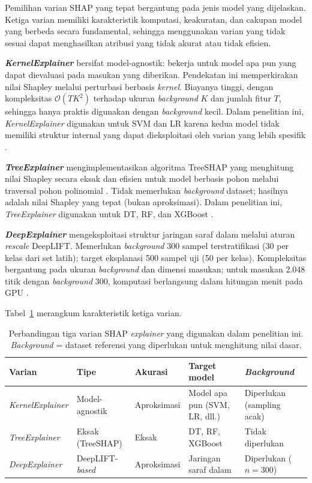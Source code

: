 Pemilihan varian SHAP yang tepat bergantung pada jenis model yang
dijelaskan. Ketiga varian memiliki karakteristik komputasi, keakuratan, dan
cakupan model yang berbeda secara fundamental, sehingga menggunakan varian
yang tidak sesuai dapat menghasilkan atribusi yang tidak akurat atau tidak
efisien.

\textbf{\emph{KernelExplainer}} bersifat model-agnostik: bekerja untuk model
apa pun yang dapat dievaluasi pada masukan yang diberikan. Pendekatan ini
memperkirakan nilai Shapley melalui perturbasi berbasis \emph{kernel}. Biayanya
tinggi, dengan kompleksitas $\mathcal{O}(TK^2)$ terhadap ukuran \emph{background}
$K$ dan jumlah fitur $T$, sehingga hanya praktis digunakan dengan
\emph{background} kecil. Dalam penelitian ini, \emph{KernelExplainer}
digunakan untuk SVM dan LR karena kedua model tidak memiliki struktur internal
yang dapat dieksploitasi oleh varian yang lebih spesifik
.

\textbf{\emph{TreeExplainer}} mengimplementasikan algoritma TreeSHAP yang
menghitung nilai Shapley secara eksak dan efisien untuk model berbasis pohon
melalui traversal pohon polinomial . Tidak
memerlukan \emph{background} dataset; hasilnya adalah nilai Shapley yang
tepat (bukan aproksimasi). Dalam penelitian ini, \emph{TreeExplainer}
digunakan untuk DT, RF, dan XGBoost .

\textbf{\emph{DeepExplainer}} mengeksploitasi struktur jaringan saraf dalam
melalui aturan \emph{rescale} DeepLIFT. Memerlukan \emph{background} 300 sampel
terstratifikasi (30 per kelas dari set latih); target eksplanasi 500 sampel uji
(50 per kelas). Kompleksitas bergantung pada ukuran \emph{background} dan
dimensi masukan; untuk masukan 2.048 titik dengan \emph{background} 300, komputasi
berlangsung dalam hitungan menit pada GPU .

Tabel~\ref{tab:bab2_shap_variants} merangkum karakteristik ketiga varian.

\begin{table}[ht]
  \centering
  \caption{Perbandingan tiga varian SHAP \emph{explainer} yang digunakan dalam
           penelitian ini. \emph{Background} = dataset referensi yang diperlukan
           untuk menghitung nilai dasar.}
  \label{tab:bab2_shap_variants}
  \footnotesize
  \begin{tabularx}{\textwidth}{@{}l l l X l@{}}
    \toprule
    \textbf{Varian} & \textbf{Tipe} & \textbf{Akurasi} & \textbf{Target model}
      & \textbf{\emph{Background}} \\
    \midrule
    \emph{KernelExplainer}
      & Model-agnostik & Aproksimasi & Model apa pun (SVM, LR, dll.)
      & Diperlukan (sampling acak) \\
    \emph{TreeExplainer}
      & Eksak (TreeSHAP) & Eksak & DT, RF, XGBoost
      & Tidak diperlukan \\
    \emph{DeepExplainer}
      & DeepLIFT-\emph{based} & Aproksimasi & Jaringan saraf dalam
      & Diperlukan ($n = 300$) \\
    \bottomrule
  \end{tabularx}
\end{table}

